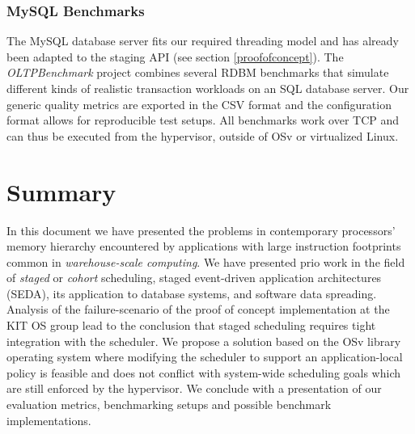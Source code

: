 \documentclass{article}
\begin{document}
\subsubsection{MySQL Benchmarks}

The MySQL database server fits our required threading model and has already been adapted to the staging API
(see section \ref{proofofconcept}).
The \textit{OLTPBenchmark} project \cite{oltpbench} combines several RDBM benchmarks that simulate different kinds of
realistic transaction workloads on an SQL database server.
Our generic quality metrics are exported in the CSV format and the configuration format allows for reproducible test
setups.
All benchmarks work over TCP and can thus be executed from the hypervisor, outside of OSv or virtualized Linux.

\section{Summary}

In this document we have presented the problems in contemporary processors' memory hierarchy encountered by applications
with large instruction footprints common in \textit{warehouse-scale computing}.
We have presented prio work in the field of
\emph{staged} or \emph{cohort} scheduling,
staged event-driven application architectures (SEDA),
its application to database systems,
and software data spreading.
Analysis of the failure-scenario of the proof of concept implementation at the KIT OS group lead to the conclusion that
staged scheduling requires tight integration with the scheduler.
We propose a solution based on the OSv library operating system where modifying the scheduler to support an
application-local policy is feasible and does not conflict with system-wide scheduling goals which are still enforced by
the hypervisor.
We conclude with a presentation of our evaluation metrics, benchmarking setups and possible benchmark implementations.

\clearpage

\printbibliography
\end{document}
